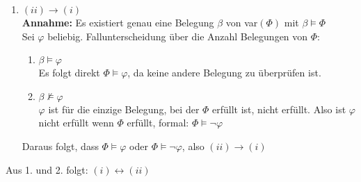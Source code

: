 \documentclass[a4paper,10pt]{article}
\begin{document}
\begin{enumerate}
 		\item 	\( (ii) \rightarrow (i) \)	\\
 			\textbf{Annahme: } Es existiert genau eine Belegung \(\beta \) von var\((\Phi)\) mit \( \beta \vDash \Phi\)\\
 			Sei $\varphi$ beliebig. Fallunterscheidung über die Anzahl Belegungen von $\Phi$:
 			\begin{enumerate}
 				\item 	$\beta \vDash \varphi $ \\
 					Es folgt direkt \(\Phi \vDash \varphi  \), da keine andere Belegung zu überprüfen ist. 
 				\item  	$\beta \not \vDash \varphi$ \\
 					$\varphi$ ist für die einzige Belegung, bei der $\Phi$ erfüllt ist, nicht erfüllt. Also ist $\varphi$ nicht erfüllt wenn $\Phi$ erfüllt, formal: \(\Phi \vDash \lnot\varphi  \)
 			\end{enumerate}
 			Daraus folgt, dass $\Phi \vDash \varphi$ oder $\Phi \vDash \lnot \varphi$, also $(ii) \rightarrow (i)$		
 	\end{enumerate}
 	Aus 1. und 2. folgt: $(i) \leftrightarrow (ii)$
\end{document}
